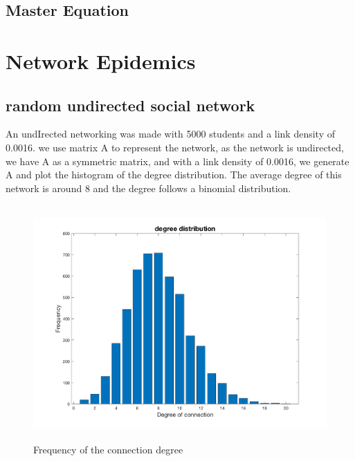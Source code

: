 \documentclass[12pt]{article}
\begin{document}
\newpage
\subsection{Master Equation}







\newpage
\section{Network Epidemics}
\doublespacing

\subsection{random undirected social network}

An undIrected networking was made with 5000 students and a link density of 0.0016. we use matrix A to represent the network, as the network is undirected, we have A as a symmetric matrix, and with a link density of 0.0016, we generate A and plot the histogram of the degree distribution. The average degree of this network is around 8 and the degree follows a binomial distribution. 

\begin{figure}[H] %
\centering
\includegraphics[width = 12 cm, height = 9cm]{randomf.png}
\caption{Frequency of the connection degree}
\label{fig:randomconnect}
\end{figure}
\end{document}
